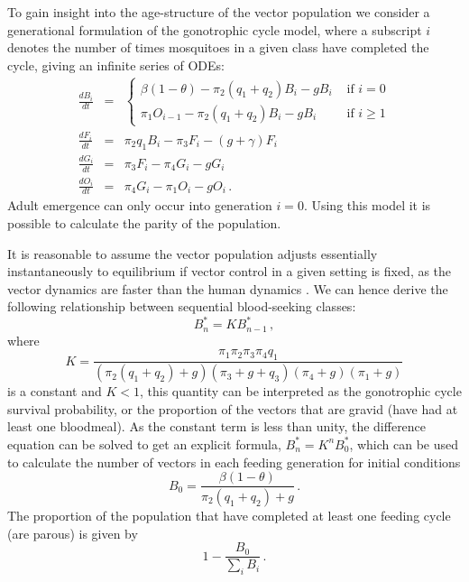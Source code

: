 To gain insight into the age-structure of the vector population we consider a generational formulation of the gonotrophic cycle model, where a subscript $i$ denotes the number of times mosquitoes in a given class have completed the cycle, giving an infinite series of ODEs:
\begin{eqnarray}
\frac{dB_i}{dt} &=& \begin{cases}  \beta(1-\theta) - \pi_2(q_1+q_2)B_{i} -gB_{i} &\mbox{ if } i=0\\ \pi_1O_{i-1} - \pi_2(q_1+q_2)B_{i} -gB_{i} &\mbox{ if } i\geq 1
\end{cases}\\
\frac{dF_i}{dt} &=& \pi_2q_1B_i - \pi_3 F_i - (g+\gamma) F_i \\
\frac{dG_i}{dt} &=& \pi_3F_i - \pi_4G_i - g G_i \\
\frac{dO_i}{dt} &=& \pi_4G_i - \pi_1O_i - g O_i \,.
\label{eqn:dist}
\end{eqnarray}
Adult emergence can only occur into generation $i=0$. Using this model it is possible to calculate the \gls{parity} of the population.

It is reasonable to assume the vector population adjusts essentially instantaneously to equilibrium if vector control in a given setting is fixed, as the vector dynamics are faster than the human dynamics \cite{May1979}. We can hence derive the following relationship between sequential blood-seeking classes:
\begin{equation}
B_n^* = KB_{n-1}^*\,,
\end{equation}
where
\begin{equation}
K = \frac{\pi_1\pi_2\pi_3\pi_4q_1}{(\pi_2(q_1+q_2)+g)(\pi_3+g+q_3)(\pi_4+g)(\pi_1+g)}
\end{equation}
is a constant and $K<1$, this quantity can be interpreted as the gonotrophic cycle survival probability, or the proportion of the vectors that are gravid (have had at least one bloodmeal). As the constant term is less than unity, the difference equation can be solved to get an explicit formula, $B_n^* = K^nB_0^*$, which can be used to calculate the number of vectors in each feeding generation for initial conditions
\begin{equation}
B_0 = \frac{\beta(1-\theta)}{\pi_2(q_1+q_2)+g}\,.
\end{equation}
The proportion of the population that have completed at least one feeding cycle (are parous) is given by
\begin{equation}
1-\frac{B_0}{\sum_i B_i}\,.
\end{equation}

